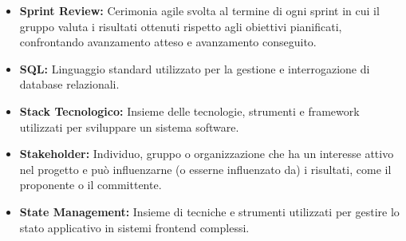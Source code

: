 \begin{itemize}[leftmargin=*]
            ogni sprint in cui il gruppo analizza il proprio modo di lavorare,
            identifica criticità e definisce azioni di miglioramento per lo sprint
            successivo.
      \item \textbf{Sprint Review:} Cerimonia agile svolta al termine di ogni sprint
            in cui il gruppo valuta i risultati ottenuti rispetto agli obiettivi
            pianificati, confrontando avanzamento atteso e avanzamento conseguito.
      \item \textbf{SQL:} Linguaggio standard utilizzato per la gestione e interrogazione di database relazionali.
      \item \textbf{Stack Tecnologico:} Insieme delle tecnologie, strumenti e framework utilizzati per sviluppare un sistema software.
      \item \textbf{Stakeholder:} Individuo, gruppo o organizzazione che ha un interesse attivo nel progetto e può influenzarne (o esserne influenzato da) i risultati, come il proponente o il committente.
      \item \textbf{State Management:} Insieme di tecniche e strumenti utilizzati per gestire lo stato applicativo in sistemi frontend complessi.
\end{itemize}
 
{}
